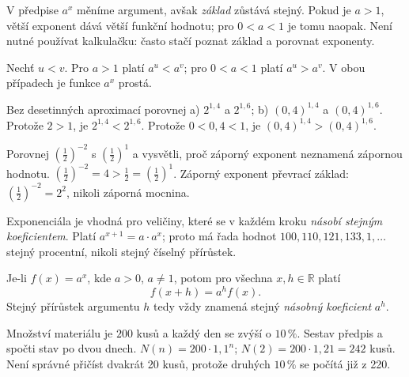 \documentclass[11pt,a4paper]{article}
\begin{document}
V předpise $a^x$ měníme argument, avšak \emph{základ} zůstává stejný. Pokud je $a>1$, větší exponent dává větší funkční hodnotu; pro $0<a<1$ je tomu naopak. Není nutné používat kalkulačku: často stačí poznat základ a porovnat exponenty.
\begin{zadaniBox}[title={Věta - Porovnávání exponenciálních hodnot}]
Nechť $u<v$. Pro $a>1$ platí $a^u<a^v$; pro $0<a<1$ platí $a^u>a^v$. V obou případech je funkce $a^x$ prostá.
\end{zadaniBox}
\begin{prikladReseniBox}[title={Příklad 1}]
Bez desetinných aproximací porovnej a) $2^{1{,}4}$ a $2^{1{,}6}$; b) $(0{,}4)^{1{,}4}$ a $(0{,}4)^{1{,}6}$.
\tcblower
Protože $2>1$, je $2^{1{,}4}<2^{1{,}6}$. Protože $0<0{,}4<1$, je $(0{,}4)^{1{,}4}>(0{,}4)^{1{,}6}$.
\end{prikladReseniBox}
\begin{prikladReseniBox}[title={Příklad 2}]
Porovnej $(\frac{1}{2})^{-2}$ s $(\frac{1}{2})^1$ a vysvětli, proč záporný exponent neznamená zápornou hodnotu.
\tcblower
$(\frac{1}{2})^{-2}=4>\frac{1}{2}=(\frac{1}{2})^1$. Záporný exponent převrací základ: $(\frac{1}{2})^{-2}=2^2$, nikoli záporná mocnina.
\end{prikladReseniBox}
Exponenciála je vhodná pro veličiny, které se v každém kroku \emph{násobí stejným koeficientem}. Platí $a^{x+1}=a\cdot a^x$; proto má řada hodnot $100,110,121,133{,}1,\ldots$ stejný procentní, nikoli stejný číselný přírůstek.
\begin{zadaniBox}[title={Věta - Násobný koeficient exponenciální funkce}]
Je-li $f(x)=a^x$, kde $a>0$, $a\ne1$, potom pro všechna $x,h\in\mathbb R$ platí
\[ f(x+h)=a^h f(x). \]
Stejný přírůstek argumentu $h$ tedy vždy znamená stejný \emph{násobný koeficient} $a^h$.
\end{zadaniBox}
\begin{prikladReseniBox}[title={Příklad 3}]
Množství materiálu je $200$ kusů a každý den se zvýší o $10\,\%$. Sestav předpis a spočti stav po dvou dnech.
\tcblower
$N(n)=200\cdot1{,}1^n$; $N(2)=200\cdot1{,}21=242$ kusů. Není správné přičíst dvakrát 20 kusů, protože druhých $10\,\%$ se počítá již z 220.
\end{prikladReseniBox}
\end{document}
